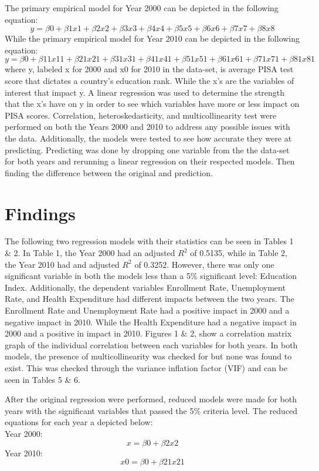 \documentclass[12pt,english]{article}
\begin{document}
The primary empirical model for Year 2000 can be depicted in the following equation:\\
 \[y=\beta0+\beta1x1+\beta2x2+\beta3x3+\beta4x4+\beta5x5+\beta6x6+\beta7x7+\beta8x8\]
While the primary empirical model for Year 2010 can be depicted in the following equation:\\
\[y=\beta0+\beta11x11+\beta21x21+\beta31x31+\beta41x41+\beta51x51+\beta61x61+\beta71x71+\beta81x81\]
where y, labeled x for 2000 and x0 for 2010 in the data-set, is average PISA test score that dictates a country’s education rank. While the x’s are the variables of interest that impact y. A linear regression was used to determine the strength that the x’s have on y in order to see which variables have more or less impact on PISA scores.
Correlation, heteroskedasticity, and multicollinearity test were performed on both the Years 2000 and 2010 to address any possible issues with the data. Additionally, the models were tested to see how accurate they were at predicting. Predicting was done by dropping one variable from the the data-set for both years and rerunning a linear regression on their respected models. Then finding the difference between the original and prediction.  


\section{Findings}
The following two regression models with their statistics can be seen in Tables 1 \& 2. In Table 1, the Year 2000 had an adjusted $R^2$ of 0.5135, while in Table 2, the Year 2010 had and adjusted $R^2$ of 0.3252. However, there was only one significant variable in both the models less than a 5\% significant level: Education Index. Additionally, the dependent variables Enrollment Rate, Unemployment Rate, and Health Expenditure had different impacts between the two years. The Enrollment Rate and Unemployment Rate had a positive impact in 2000 and a negative impact in 2010. While the Health Expenditure had a negative impact in 2000 and a positive in impact in 2010. Figures 1 \& 2, show a correlation matrix graph of the individual correlation between each variables for both years.  In both models, the presence of multicollinearity was checked for but none was found to exist. This was checked through the variance inflation factor (VIF) and  can be seen in Tables 5 \& 6.

After the original regression were performed, reduced models were made for both years with the significant variables that passed the 5\% criteria level. The reduced equations for each year a depicted below:\\
                      Year 2000:
\[x=\beta0+\beta2x2\]
				     Year 2010:
\[x0=\beta0+\beta21x21\]
\end{document}

